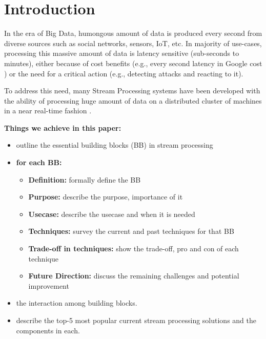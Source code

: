 \section{Introduction}
\label{sec:intro}

In the era of Big Data, humongous amount of data is produced every second from diverse sources such as social networks, sensors, IoT, etc. In majority of use-cases, processing this massive amount of data  is latency sensitive (sub-seconds to minutes), either because of  cost benefits (e.g., every second latency in Google cost ) or the need for a critical action (e.g., detecting attacks and reacting to it).

To address this need, many Stream Processing systems have been developed with the ability of processing huge amount of data on a distributed cluster of machines in a near real-time fashion .  


\textbf{Things we achieve in this paper: }

\begin{itemize}
	\item outline the essential building blocks (BB) in stream processing
	\item \textbf{for each BB: }
	\begin{itemize}
		\item \textbf{Definition: } formally define the BB 
		\item \textbf{Purpose: } describe the purpose, importance of it
		\item \textbf{Usecase: } describe the usecase and when it is needed
		\item \textbf{Techniques: } survey the current  and past techniques for that BB
		\item \textbf{Trade-off in techniques: } show the trade-off, pro and con of  each technique
		\item \textbf{Future Direction:} discuss the remaining challenges and potential improvement
	\end{itemize}
	\item the interaction among building blocks.
	\item describe the top-5 most popular current stream processing solutions and the components in each.

\end{itemize}






